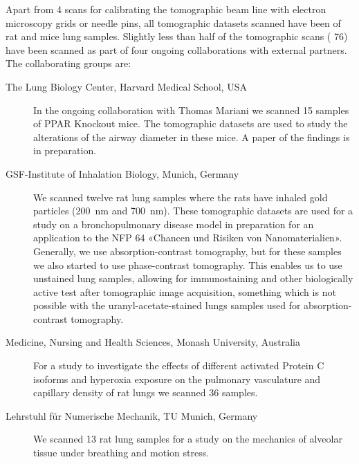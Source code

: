 \documentclass[a4paper,twoside,DIV=calc]{scrartcl}
\begin{document}
Apart from 4 scans for calibrating the tomographic beam line with electron microscopy grids or needle pins, all tomographic datasets scanned have been of rat and mice lung samples. Slightly less than half of the tomographic scans (%
76) have been scanned as part of four ongoing collaborations with external partners. The collaborating groups are:
\begin{description}
\item[The Lung Biology Center, Harvard Medical School, USA] In the ongoing collaboration with Thomas Mariani we scanned 15 samples of PPAR Knockout mice. The tomographic datasets are used to study the alterations of the airway diameter in these mice. A paper of the findings is in preparation.
\item[GSF-Institute of Inhalation Biology, Munich, Germany] We scanned twelve rat lung samples where the rats have inhaled gold particles (\SI{200}{\nano\meter} and \SI{700}{\nano\meter}). These tomographic datasets are used for a study on a bronchopulmonary disease model in preparation for an application to the NFP 64 «Chancen und Risiken von Nanomaterialien». Generally, we use absorption-contrast tomography, but for these samples we also started to use phase-contrast tomography. This enables us to use unstained lung samples, allowing for immunostaining and other biologically active test after tomographic image acquisition, something which is not possible with the uranyl-acetate-stained lungs samples used for absorption-contrast tomography.
\item[Medicine, Nursing and Health Sciences, Monash University, Australia] For a study to investigate the effects of different activated Protein C isoforms and hyperoxia exposure on the pulmonary vasculature and capillary density of rat lungs we scanned 36 samples. 
\item[Lehrstuhl für Numerische Mechanik, TU Munich, Germany] We scanned 13 rat lung samples for a study on the mechanics of alveolar tissue under breathing and motion stress.
\end{description}

\end{document}
